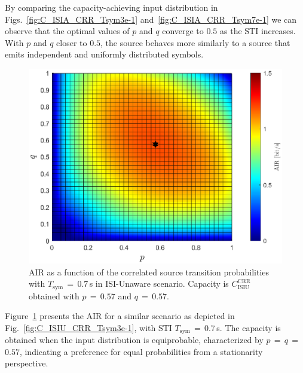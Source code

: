 \documentclass[journal]{IEEEtranTCOM}
\begin{document}
By comparing the capacity-achieving input distribution in Figs.~\ref{fig:C_ISIA_CRR_Tsym3e-1} and~\ref{fig:C_ISIA_CRR_Tsym7e-1} we can observe that the optimal values of $p$ and $q$ converge to $0.5$ as the STI increases. With $p$ and $q$ closer to $0.5$, the source behaves more similarly to a source that emits independent and uniformly distributed symbols.
\begin{figure}
    \centering
    \includegraphics[width=1\linewidth]{Figures/ISIU_CRR_Tsym7e-1.eps}
    \caption{AIR as a function of the correlated source transition probabilities with $T_{\mathrm{sym}}$$\,=\,$$0.7$\,s in ISI-Unaware scenario. Capacity is $C_{\text{ISIU}}^{\text{CRR}}$ obtained with $p$$\,=\,$$0.57$ and $q$$\,=\,$$0.57$.}
    \label{fig:C_ISIU_CRR_Tsym7e-1}
\end{figure}
\par Figure~\ref{fig:C_ISIU_CRR_Tsym7e-1} presents the AIR for a similar scenario as depicted in Fig.~\ref{fig:C_ISIU_CRR_Tsym3e-1}, with STI $T_{\mathrm{sym}}$$\,=\,$$0.7$\,s. The capacity is obtained when the input distribution is equiprobable, characterized by $p$$\,=\,$$q$$\,=\,$$0.57$, indicating a preference for equal probabilities from a stationarity perspective.
\end{document}

